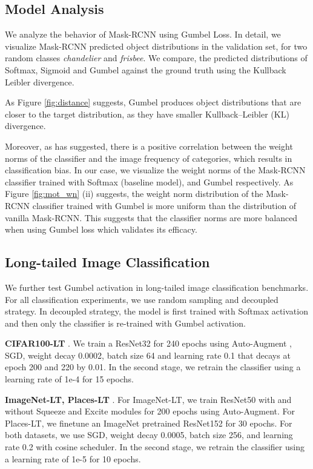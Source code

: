 \documentclass[runningheads]{llncs}
\begin{document}
\subsection{Model Analysis}
We analyze the behavior of Mask-RCNN using Gumbel Loss. In detail, we visualize Mask-RCNN predicted object distributions in the validation set, for two random classes \textit{chandelier} and \textit{frisbee}. We compare, the predicted distributions  of Softmax, Sigmoid and Gumbel against the ground truth  using the Kullback Leibler divergence.

As Figure \ref{fig:distance} suggests, Gumbel produces object distributions that are closer to the target distribution, as they have smaller Kullback–Leibler (KL) divergence.

Moreover, as \cite{kang2019decoupling} has suggested, there is a positive correlation between the weight norms of the classifier and the image frequency of categories, which results in classification bias. In our case, we visualize the weight norms of the Mask-RCNN classifier trained with Softmax (baseline model), and Gumbel respectively. As Figure \ref{fig:mot_wn} (ii) suggests, the weight norm distribution of the Mask-RCNN classifier trained with Gumbel is more uniform than the distribution of vanilla Mask-RCNN. This suggests that the classifier norms are more balanced when using Gumbel loss which validates its efficacy.

\subsection{Long-tailed Image Classification}
We further test Gumbel activation in long-tailed image classification benchmarks. For all classification experiments, we use random sampling and decoupled strategy. In decoupled strategy, the model is first trained with Softmax activation and then only the classifier is re-trained with Gumbel activation.

\noindent\textbf{CIFAR100-LT} \cite{cao2019learning}. We train a ResNet32 for 240 epochs using Auto-Augment \cite{cubuk2019autoaugment}, SGD, weight decay 0.0002, batch size 64 and learning rate 0.1 that decays at epoch 200 and 220 by 0.01. In the second stage, we retrain the classifier using a learning rate of 1e-4 for 15 epochs.

\noindent\textbf{ImageNet-LT, Places-LT} \cite{liu2019large}. For ImageNet-LT, we train ResNet50 with and without Squeeze and Excite \cite{hu2018squeeze} modules for 200 epochs using Auto-Augment. For Places-LT, we finetune an ImageNet pretrained ResNet152 for 30 epochs. For both datasets, we use SGD, weight decay 0.0005, batch size 256, and learning rate 0.2 with cosine scheduler. In the second stage, we retrain the classifier using a learning rate of 1e-5 for 10 epochs. 
\end{document}
